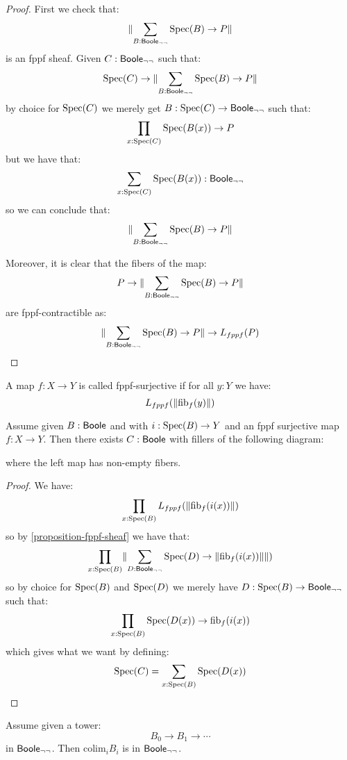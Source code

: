 \begin{proof}
First we check that: 
\[\lVert \sum_{B:\mathsf{Boole}_{\neg\neg}}\operatorname{Spec}(B)\to P \rVert\]
is an fppf sheaf. Given $C:\mathsf{Boole}_{\neg\neg}$ such that:
\[\operatorname{Spec}(C)\to \lVert \sum_{B:\mathsf{Boole}_{\neg\neg}}\operatorname{Spec}(B)\to P \rVert\]
by choice for $\operatorname{Spec}(C)$ we merely get $B:\operatorname{Spec}(C)\to \mathsf{Boole}_{\neg\neg}$ such that:
\[\prod_{x:\operatorname{Spec}(C)}\operatorname{Spec}(B(x))\to P\]
but we have that:
\[\sum_{x:\operatorname{Spec}(C)}\operatorname{Spec}(B(x)):\mathsf{Boole}_{\neg\neg}\]
so we can conclude that:
\[\lVert \sum_{B:\mathsf{Boole}_{\neg\neg}}\operatorname{Spec}(B)\to P \rVert\]

Moreover, it is clear that the fibers of the map:
\[P\to \lVert \sum_{B:\mathsf{Boole}_{\neg\neg}}\operatorname{Spec}(B)\to P \rVert\] 
are fppf-contractible as:
\[\lVert \sum_{B:\mathsf{Boole}_{\neg\neg}}\operatorname{Spec}(B)\to P \rVert\to L_{fppf}(P)\]
\end{proof}

\begin{definition}
A map $f:X\to Y$ is called fppf-surjective if for all $y:Y$ we have: 
\[L_{fppf}(\lVert \mathrm{fib}_f(y) \rVert)\]
\end{definition}

\begin{lemma}\label{fppf-local-choice}
Assume given $B:\mathsf{Boole}$ and with $i:\operatorname{Spec}(B)\to Y$ and an fppf surjective map $f:X\to Y$. Then there exists $C:\mathsf{Boole}$ with fillers of the following diagram:
\begin{center}
\end{center}
where the left map has non-empty fibers.
\end{lemma}

\begin{proof}
We have:
\[\prod_{x:\operatorname{Spec}(B)} L_{fppf}(\lVert \mathrm{fib}_f(i(x)) \rVert)\]
so by \cref{proposition-fppf-sheaf} we have that:
\[\prod_{x:\operatorname{Spec}(B)} \lVert \sum_{D:\mathsf{Boole}_{\neg\neg}} \operatorname{Spec}(D)\to \lVert \mathrm{fib}_f(i(x)) \rVert \rVert)\]
so by choice for $\operatorname{Spec}(B)$ and $\operatorname{Spec}(D)$ we merely have $D:\operatorname{Spec}(B)\to \mathsf{Boole}_{\neg\neg}$ such that:
\[\prod_{x:\operatorname{Spec}(B)} \operatorname{Spec}(D(x))\to \mathrm{fib}_f(i(x))\]
which gives what we want by defining:
\[\operatorname{Spec}(C) = \sum_{x:\operatorname{Spec}(B)}\operatorname{Spec}(D(x))\]
\end{proof}

\begin{lemma}\label{colimit-fppf}
Assume given a tower:
\[B_0\to B_1\to \cdots\]
in $\mathsf{Boole}_{\neg\neg}$. Then $\mathrm{colim}_i B_i$ is in $\mathsf{Boole}_{\neg\neg}$.
\end{lemma}

